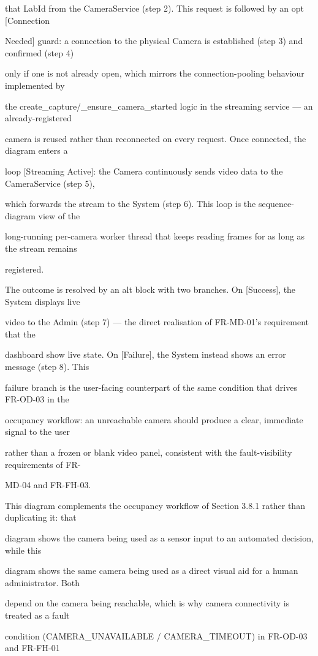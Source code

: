 that LabId from the CameraService (step 2). This request is followed by an opt [Connection

		Needed] guard: a connection to the physical Camera is established (step 3) and confirmed (step 4)

only if one is not already open, which mirrors the connection-pooling behaviour implemented by

the create\_capture/\_ensure\_camera\_started logic in the streaming service --- an already-registered

camera is reused rather than reconnected on every request. Once connected, the diagram enters a

loop [Streaming Active]: the Camera continuously sends video data to the CameraService (step 5),

which forwards the stream to the System (step 6). This loop is the sequence-diagram view of the

long-running per-camera worker thread that keeps reading frames for as long as the stream remains

registered.

The outcome is resolved by an alt block with two branches. On [Success], the System displays live

video to the Admin (step 7) --- the direct realisation of FR-MD-01's requirement that the

dashboard show live state. On [Failure], the System instead shows an error message (step 8). This

failure branch is the user-facing counterpart of the same condition that drives FR-OD-03 in the

occupancy workflow: an unreachable camera should produce a clear, immediate signal to the user

rather than a frozen or blank video panel, consistent with the fault-visibility requirements of FR-

MD-04 and FR-FH-03.

This diagram complements the occupancy workflow of Section 3.8.1 rather than duplicating it: that

diagram shows the camera being used as a sensor input to an automated decision, while this

diagram shows the same camera being used as a direct visual aid for a human administrator. Both

depend on the camera being reachable, which is why camera connectivity is treated as a fault

condition (CAMERA\_UNAVAILABLE / CAMERA\_TIMEOUT) in FR-OD-03 and FR-FH-01

